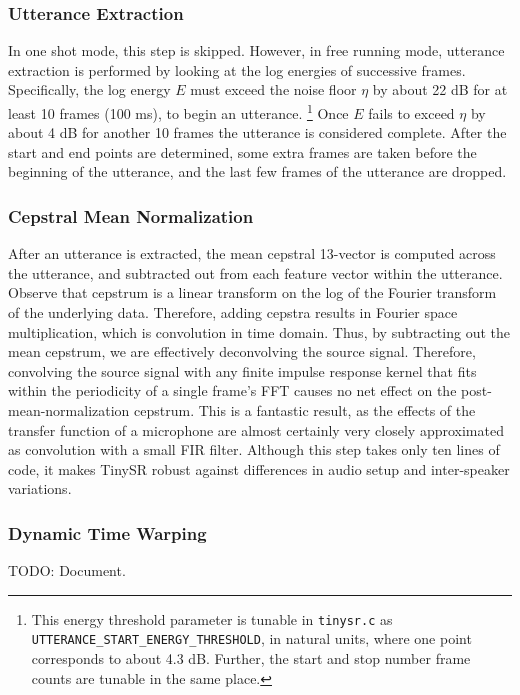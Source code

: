 \documentclass{article}
\begin{document}
\subsubsection{Utterance Extraction}
In one shot mode, this step is skipped.
However, in free running mode, utterance extraction is performed by looking at the log energies of successive frames.
Specifically, the log energy $E$ must exceed the noise floor $\eta$ by about 22 dB for at least 10 frames (100 ms), to begin an utterance.%
\footnote{This energy threshold parameter is tunable in \texttt{tinysr.c} as \texttt{UTTERANCE\_START\_ENERGY\_THRESHOLD}, in natural units, where one point corresponds to about 4.3 dB. Further, the start and stop number frame counts are tunable in the same place.}
Once $E$ fails to exceed $\eta$ by about 4 dB for another 10 frames the utterance is considered complete.
After the start and end points are determined, some extra frames are taken before the beginning of the utterance, and the last few frames of the utterance are dropped.

\subsubsection{Cepstral Mean Normalization}
After an utterance is extracted, the mean cepstral 13-vector is computed across the utterance, and subtracted out from each feature vector within the utterance.
Observe that cepstrum is a linear transform on the log of the Fourier transform of the underlying data.
Therefore, adding cepstra results in Fourier space multiplication, which is convolution in time domain.
Thus, by subtracting out the mean cepstrum, we are effectively deconvolving the source signal.
Therefore, convolving the source signal with any finite impulse response kernel that fits within the periodicity of a single frame's FFT causes no net effect on the post-mean-normalization cepstrum.
This is a fantastic result, as the effects of the transfer function of a microphone are almost certainly very closely approximated as convolution with a small FIR filter.
Although this step takes only ten lines of code, it makes TinySR robust against differences in audio setup and inter-speaker variations.

\subsubsection{Dynamic Time Warping}
TODO: Document.
\end{document}
